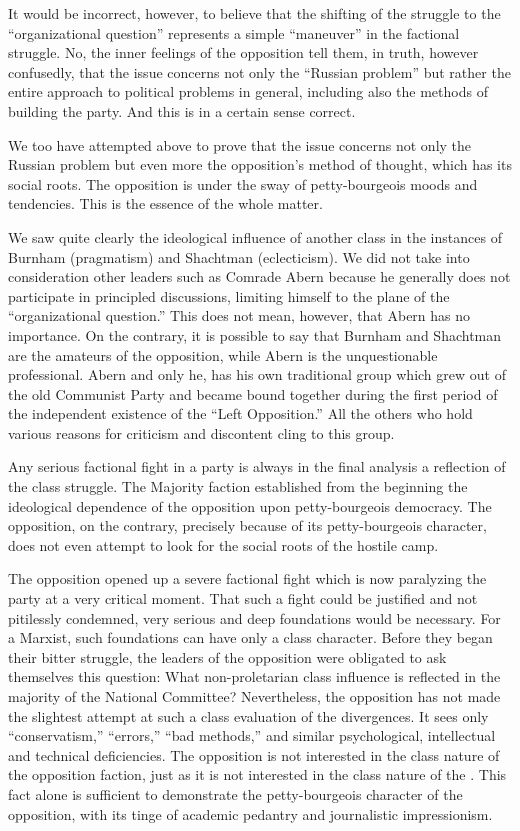 It would be incorrect, however, to believe that the shifting of the struggle to the “organizational question” represents a simple “maneuver” in the factional struggle. No, the inner feelings of the opposition tell them, in truth, however confusedly, that the issue concerns not only the “Russian problem” but rather the entire approach to political problems in general, including also the methods of building the party. And this is in a certain sense correct.

We too have attempted above to prove that the issue concerns not only the Russian problem but even more the opposition’s method of thought, which has its social roots. The opposition is under the sway of petty-bourgeois moods and tendencies. This is the essence of the whole matter.

We saw quite clearly the ideological influence of another class in the instances of Burnham (pragmatism) and Shachtman (eclecticism). We did not take into consideration other leaders such as Comrade Abern because he generally does not participate in principled discussions, limiting himself to the plane of the “organizational question.” This does not mean, however, that Abern has no importance. On the contrary, it is possible to say that Burnham and Shachtman are the amateurs of the opposition, while Abern is the unquestionable professional. Abern and only he, has his own traditional group which grew out of the old Communist Party and became bound together during the first period of the independent existence of the “Left Opposition.” All the others who hold various reasons for criticism and discontent cling to this group.

Any serious factional fight in a party is always in the final analysis a reflection of the class struggle. The Majority faction established from the beginning the ideological dependence of the opposition upon petty-bourgeois democracy. The opposition, on the contrary, precisely because of its petty-bourgeois character, does not even attempt to look for the social roots of the hostile camp.

The opposition opened up a severe factional fight which is now paralyzing the party at a very critical moment. That such a fight could be justified and not pitilessly condemned, very serious and deep foundations would be necessary. For a Marxist, such foundations can have only a class character. Before they began their bitter struggle, the leaders of the opposition were obligated to ask themselves this question: What non-proletarian class influence is reflected in the majority of the National Committee? Nevertheless, the opposition has not made the slightest attempt at such a class evaluation of the divergences. It sees only “conservatism,” “errors,” “bad methods,” and similar psychological, intellectual and technical deficiencies. The opposition is not interested in the class nature of the opposition faction, just as it is not interested in the class nature of the \USSR. This fact alone is sufficient to demonstrate the petty-bourgeois character of the opposition, with its tinge of academic pedantry and journalistic impressionism.


